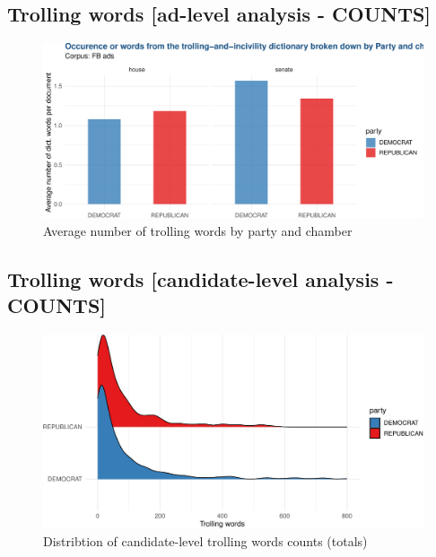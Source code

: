 \documentclass[
  12pt,
]{article}
\begin{document}
\pagebreak
\clearpage

\hypertarget{trolling-words-ad-level-analysis---counts}{%
\subsection{Trolling words {[}ad-level analysis - COUNTS{]}}\label{trolling-words-ad-level-analysis---counts}}

\begin{figure}
\centering
\includegraphics{figsFB/unnamed-chunk-17-1.pdf}
\caption{\label{fig:unnamed-chunk-17}Average number of trolling words by party and chamber}
\end{figure}

\pagebreak
\clearpage

\hypertarget{trolling-words-candidate-level-analysis---counts}{%
\subsection{Trolling words {[}candidate-level analysis - COUNTS{]}}\label{trolling-words-candidate-level-analysis---counts}}

\begin{figure}
\centering
\includegraphics{figsFB/unnamed-chunk-18-1.pdf}
\caption{\label{fig:unnamed-chunk-18}Distribtion of candidate-level trolling words counts (totals)}
\end{figure}
\end{document}
